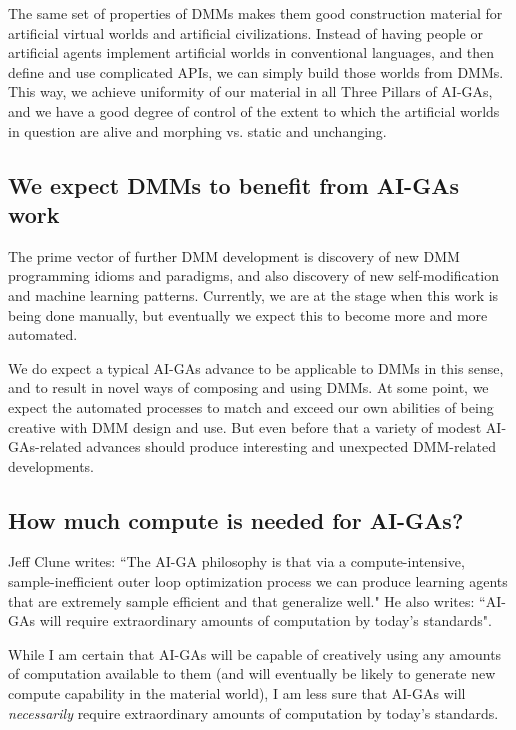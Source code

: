 \documentclass{article}
\begin{document}
The same set of properties of DMMs makes them good construction material for artificial virtual worlds and
artificial civilizations. Instead of having people or artificial agents implement artificial worlds in conventional languages,
and then define and use complicated APIs, we can simply build those worlds from DMMs. This way, we achieve uniformity
of our material in all Three Pillars of AI-GAs, and we have a good degree of control of the extent to which the
artificial worlds in question are alive and morphing vs. static and unchanging.

\subsection{We expect DMMs to benefit from AI-GAs work}

The prime vector of further DMM development is discovery of new DMM programming idioms
and paradigms, and also discovery of new self-modification and machine learning patterns.
Currently, we are at the stage when this work is being done manually, but eventually we
expect this to become more and more automated.

We do expect a typical AI-GAs advance to be applicable to DMMs in this sense, and to result
in novel ways of composing and using DMMs. At some point, we expect the automated processes
to match and exceed our own abilities of being creative with DMM design and use. But even before that
a variety of modest AI-GAs-related advances should produce interesting and unexpected DMM-related developments.

\subsection{How much compute is needed for AI-GAs?}\label{sec:compute}

Jeff Clune writes: ``The AI-GA philosophy is that via a compute-intensive, 
sample-inefficient outer loop optimization process we can produce learning agents that are extremely sample efficient and that generalize well." He also writes: ``AI-GAs will require extraordinary amounts of computation by today’s standards".

While I am certain that AI-GAs will be capable of creatively using any amounts of computation
available to them (and will eventually be likely to generate new compute capability in the material world), 
I am less sure that AI-GAs will {\em necessarily} require extraordinary amounts of computation by today's standards.
\end{document}
